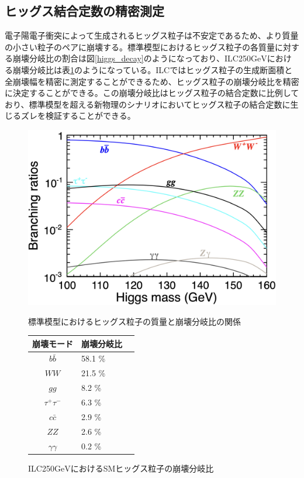 \subsection{ヒッグス結合定数の精密測定}
電子陽電子衝突によって生成されるヒッグス粒子は不安定であるため、より質量の小さい粒子のペアに崩壊する。標準模型におけるヒッグス粒子の各質量に対する崩壊分岐比の割合は図\ref{higgs_decay}のようになっており、ILC250$\mathrm{GeV}$における崩壊分岐比は表\ref{HiggsDecayonILC}のようになっている。ILCではヒッグス粒子の生成断面積と全崩壊幅を精密に測定することができるため、ヒッグス粒子の崩壊分岐比を精密に決定することができる。この崩壊分岐比はヒッグス粒子の結合定数に比例しており、標準模型を超える新物理のシナリオにおいてヒッグス粒子の結合定数に生じるズレを検証することができる。\\
\begin{figure}[H]
 \begin{minipage}[h]{.45\linewidth}
	\begin{center}
 \includegraphics[keepaspectratio, scale=0.2]
 	{Figure/Introduction/higgs_decay.png}
 	\caption{標準模型におけるヒッグス粒子の質量と崩壊分岐比の関係}
 	\label{higgs_decay}
	\end{center}
 \end{minipage}
 \hfill
\begin{minipage}[h]{.45\linewidth}
\def\@captype{table}
 \centering
  \begin{tabular}{clc}
   \hline
   崩壊モード & 崩壊分岐比\\
   \hline \hline
   $b\bar{b}$ & 58.1 \%\\
   $WW$ & 21.5 \%\\
   $gg$ & 8.2 \%\\
   ${\tau}^+ {\tau}^-$ & 6.3 \%\\
   $c \bar{c}$ & 2.9 \%\\
   $ZZ$ & 2.6 \%\\
   $\gamma \gamma$ & 0.2 \%\\
   \hline
  \end{tabular}
  \caption{ILC250$\mathrm{GeV}$におけるSMヒッグス粒子の崩壊分岐比}
  \label{HiggsDecayonILC}
 \end{minipage}
 \end{figure}
